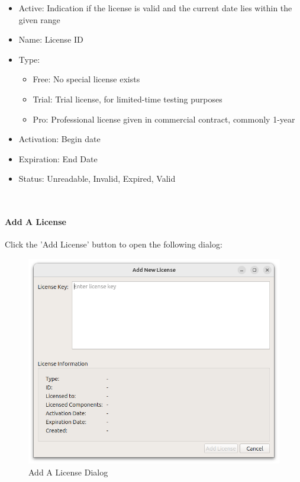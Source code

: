 \begin{itemize}
\item Active: Indication if the license is valid and the current date lies within the given range
\item Name: License ID
\item Type:
\begin{itemize}
\item Free: No special license exists
\item Trial: Trial license, for limited-time testing purposes
\item Pro: Professional license given in commercial contract, commonly 1-year
\end{itemize}
\item Activation: Begin date
\item Expiration: End Date
\item Status: Unreadable, Invalid, Expired, Valid
\end{itemize}
\ \\

\paragraph {Add A License}

Click the 'Add License' button to open the following dialog:

\begin{figure}[H]
    \includegraphics[width=14cm]{figures/configure_license_add.png}
  \caption{Add A License Dialog}
\end{figure}

